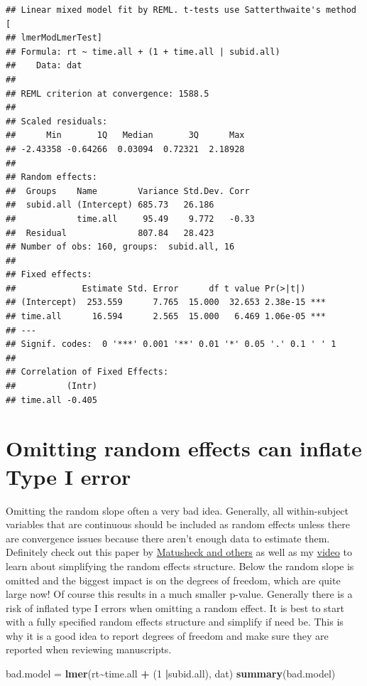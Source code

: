 \documentclass[
]{book}
\newenvironment{Shaded}{\begin{snugshade}}{\end{snugshade}}
\newcommand{\DecValTok}[1]{\textcolor[rgb]{0.00,0.00,0.81}{#1}}
\newcommand{\KeywordTok}[1]{\textcolor[rgb]{0.13,0.29,0.53}{\textbf{#1}}}
\newcommand{\NormalTok}[1]{#1}
\newcommand{\OperatorTok}[1]{\textcolor[rgb]{0.81,0.36,0.00}{\textbf{#1}}}
\newcommand{\StringTok}[1]{\textcolor[rgb]{0.31,0.60,0.02}{#1}}
\begin{document}
\begin{verbatim}
## Linear mixed model fit by REML. t-tests use Satterthwaite's method [
## lmerModLmerTest]
## Formula: rt ~ time.all + (1 + time.all | subid.all)
##    Data: dat
## 
## REML criterion at convergence: 1588.5
## 
## Scaled residuals: 
##      Min       1Q   Median       3Q      Max 
## -2.43358 -0.64266  0.03094  0.72321  2.18928 
## 
## Random effects:
##  Groups    Name        Variance Std.Dev. Corr 
##  subid.all (Intercept) 685.73   26.186        
##            time.all     95.49    9.772   -0.33
##  Residual              807.84   28.423        
## Number of obs: 160, groups:  subid.all, 16
## 
## Fixed effects:
##             Estimate Std. Error      df t value Pr(>|t|)    
## (Intercept)  253.559      7.765  15.000  32.653 2.38e-15 ***
## time.all      16.594      2.565  15.000   6.469 1.06e-05 ***
## ---
## Signif. codes:  0 '***' 0.001 '**' 0.01 '*' 0.05 '.' 0.1 ' ' 1
## 
## Correlation of Fixed Effects:
##          (Intr)
## time.all -0.405
\end{verbatim}

\hypertarget{omitting-random-effects-can-inflate-type-i-error}{%
\section*{Omitting random effects can inflate Type I error}\label{omitting-random-effects-can-inflate-type-i-error}}

Omitting the random slope often a very bad idea. Generally, all within-subject variables that are continuous should be included as random effects unless there are convergence issues because there aren't enough data to estimate them. Definitely check out this paper by \href{https://www.sciencedirect.com/science/article/pii/S0749596X17300013}{Matusheck and others} as well as my \href{https://www.youtube.com/watch?v=pDNEgcl0YhI}{video} to learn about simplifying the random effects structure.
Below the random slope is omitted and the biggest impact is on the degrees of freedom, which are quite large now! Of course this results in a much smaller p-value. Generally there is a risk of inflated type I errors when omitting a random effect. It is best to start with a fully specified random effects structure and simplify if need be. This is why it is a good idea to report degrees of freedom and make sure they are reported when reviewing manuscripts.

\begin{Shaded}
\begin{Highlighting}[]
\NormalTok{bad.model =}\StringTok{ }\KeywordTok{lmer}\NormalTok{(rt}\OperatorTok{\textasciitilde{}}\NormalTok{time.all }\OperatorTok{+}\StringTok{ }\NormalTok{(}\DecValTok{1} \OperatorTok{|}\NormalTok{subid.all), dat)}
\KeywordTok{summary}\NormalTok{(bad.model)  }
\end{Highlighting}
\end{Shaded}
\end{document}
